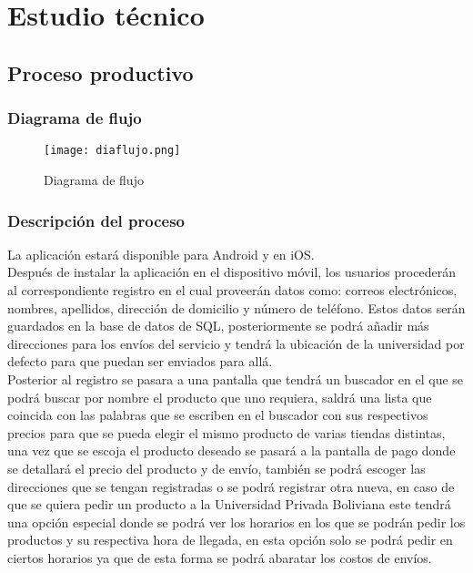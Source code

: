 \documentclass[11pt]{article}
\begin{document}
\section{Estudio técnico}
    \subsection{Proceso productivo}
        \subsubsection{Diagrama de flujo}
        \begin{figure}[H]
            \centering
            \texttt{[image: diaflujo.png]}
            \caption{Diagrama de flujo}
            \label{Diagrama_flujo}
        \end{figure}
        \subsubsection{Descripción del proceso}
        La aplicación estará disponible para Android y en iOS.\\
        
        Después de instalar la aplicación en el dispositivo móvil, los usuarios procederán al correspondiente registro en el cual proveerán datos como: correos electrónicos, nombres, apellidos, dirección de domicilio y n\'umero de teléfono. Estos datos serán guardados en la base de datos de SQL, posteriormente se podrá añadir m\'as direcciones para los envíos del servicio y tendr\'a la ubicación de la universidad por defecto para que puedan ser enviados para all\'a.\\
        
        Posterior al registro se pasara a una pantalla que tendrá un buscador en el que se podrá buscar por nombre el producto que uno requiera, saldr\'a una lista que coincida con las palabras que se escriben en el buscador con sus respectivos precios para que se pueda elegir el mismo producto de varias tiendas distintas, una vez que se escoja el producto deseado se pasar\'a a la pantalla de pago donde se detallar\'a el precio del producto y de envío, también se podrá escoger las direcciones que se tengan registradas o se podrá registrar otra nueva, en caso de que se quiera pedir un producto a la Universidad Privada Boliviana este tendrá una opción especial donde se podrá ver los horarios en los que se podrán pedir los productos y su respectiva hora de llegada, en esta opción solo se podr\'a pedir en ciertos horarios ya que de esta forma se podr\'a abaratar los costos de envíos.\\
        
\end{document}
